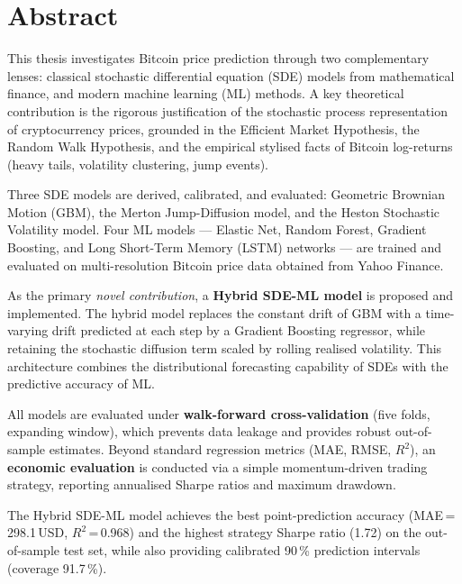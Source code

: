 \documentclass[12pt, a4paper, oneside]{report}
\theoremstyle{plain}
\theoremstyle{definition}
\theoremstyle{remark}
\begin{document}
\setcounter{page}{2}

\clearpage
\chapter*{Abstract}

This thesis investigates Bitcoin price prediction through two complementary
lenses: classical stochastic differential equation (SDE) models from
mathematical finance, and modern machine learning (ML) methods.  A key
theoretical contribution is the rigorous justification of the stochastic
process representation of cryptocurrency prices, grounded in the Efficient
Market Hypothesis, the Random Walk Hypothesis, and the empirical stylised
facts of Bitcoin log-returns (heavy tails, volatility clustering, jump events).

Three SDE models are derived, calibrated, and evaluated: Geometric Brownian
Motion (GBM), the Merton Jump-Diffusion model, and the Heston Stochastic
Volatility model.  Four ML models --- Elastic Net, Random Forest, Gradient
Boosting, and Long Short-Term Memory (LSTM) networks --- are trained and
evaluated on multi-resolution Bitcoin price data obtained from Yahoo Finance.

As the primary \emph{novel contribution}, a \textbf{Hybrid SDE-ML model} is
proposed and implemented.  The hybrid model replaces the constant drift of GBM
with a time-varying drift predicted at each step by a Gradient Boosting
regressor, while retaining the stochastic diffusion term scaled by rolling
realised volatility.  This architecture combines the distributional forecasting
capability of SDEs with the predictive accuracy of ML.

All models are evaluated under \textbf{walk-forward cross-validation} (five
folds, expanding window), which prevents data leakage and provides robust
out-of-sample estimates.  Beyond standard regression metrics (MAE, RMSE,
$R^2$), an \textbf{economic evaluation} is conducted via a simple
momentum-driven trading strategy, reporting annualised Sharpe ratios and
maximum drawdown.

The Hybrid SDE-ML model achieves the best point-prediction accuracy
(MAE\,=\,298.1\,USD, $R^2$\,=\,0.968) and the highest strategy Sharpe ratio
(1.72) on the out-of-sample test set, while also providing calibrated 90\,\%
prediction intervals (coverage 91.7\,\%).
\end{document}
